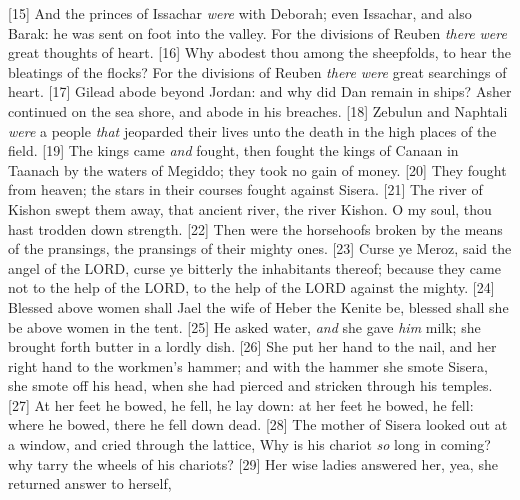 [15] \textcolor[cmyk]{0.99998,1,0,0}{And the princes of Issachar \emph{were} with Deborah; even Issachar, and also Barak: he was sent on foot into the valley. For the divisions of Reuben \emph{there} \emph{were} great thoughts of heart.}
[16] \textcolor[cmyk]{0.99998,1,0,0}{Why abodest thou among the sheepfolds, to hear the bleatings of the flocks? For the divisions of Reuben \emph{there} \emph{were} great searchings of heart.}
[17] \textcolor[cmyk]{0.99998,1,0,0}{Gilead abode beyond Jordan: and why did Dan remain in ships? Asher continued on the sea shore, and abode in his breaches.}
[18] \textcolor[cmyk]{0.99998,1,0,0}{Zebulun and Naphtali \emph{were} a people \emph{that} jeoparded their lives unto the death in the high places of the field.}
[19] \textcolor[cmyk]{0.99998,1,0,0}{The kings came \emph{and} fought, then fought the kings of Canaan in Taanach by the waters of Megiddo; they took no gain of money.}
[20] \textcolor[cmyk]{0.99998,1,0,0}{They fought from heaven; the stars in their courses fought against Sisera.}
[21] \textcolor[cmyk]{0.99998,1,0,0}{The river of Kishon swept them away, that ancient river, the river Kishon. O my soul, thou hast trodden down strength.}
[22] \textcolor[cmyk]{0.99998,1,0,0}{Then were the horsehoofs broken by the means of the pransings, the pransings of their mighty ones.}
[23] \textcolor[cmyk]{0.99998,1,0,0}{Curse ye Meroz, said the angel of the LORD, curse ye bitterly the inhabitants thereof; because they came not to the help of the LORD, to the help of the LORD against the mighty.}
[24] \textcolor[cmyk]{0.99998,1,0,0}{Blessed above women shall Jael the wife of Heber the Kenite be, blessed shall she be above women in the tent.}
[25] \textcolor[cmyk]{0.99998,1,0,0}{He asked water, \emph{and} she gave \emph{him} milk; she brought forth butter in a lordly dish.}
[26] \textcolor[cmyk]{0.99998,1,0,0}{She put her hand to the nail, and her right hand to the workmen's hammer; and with the hammer she smote Sisera, she smote off his head, when she had pierced and stricken through his temples.}
[27] \textcolor[cmyk]{0.99998,1,0,0}{At her feet he bowed, he fell, he lay down: at her feet he bowed, he fell: where he bowed, there he fell down dead.}
[28] \textcolor[cmyk]{0.99998,1,0,0}{The mother of Sisera looked out at a window, and cried through the lattice, Why is his chariot \emph{so} long in coming? why tarry the wheels of his chariots?}
[29] \textcolor[cmyk]{0.99998,1,0,0}{Her wise ladies answered her, yea, she returned answer to herself,}
